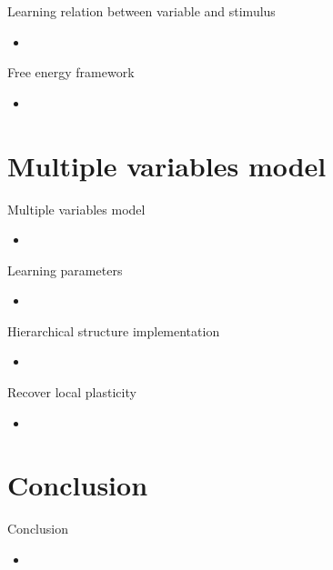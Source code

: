 \documentclass[aspectratio=43]{beamer}
\begin{document}
\begin{frame}{Learning relation between variable and stimulus}
  \begin{itemize}
    \item %
  \end{itemize}
\end{frame}

\begin{frame}{Free energy framework}
  \begin{itemize}
    \item %
  \end{itemize}
\end{frame}



\section{Multiple variables model}
\begin{frame}{Multiple variables model}
  \begin{itemize}
    \item %
  \end{itemize}
\end{frame}

\begin{frame}{Learning parameters}
  \begin{itemize}
    \item %
  \end{itemize}
\end{frame}

\begin{frame}{Hierarchical structure implementation}
  \begin{itemize}
    \item %
  \end{itemize}
\end{frame}

\begin{frame}{Recover local plasticity}
  \begin{itemize}
    \item %
  \end{itemize}
\end{frame}




\section{Conclusion}
\begin{frame}{Conclusion}
  \begin{itemize}
    \item %
  \end{itemize}
\end{frame}
\end{document}

